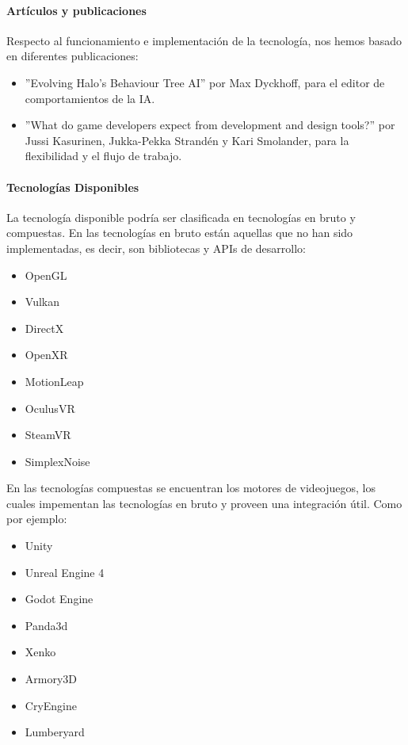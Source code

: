 \documentclass[]{article}
\begin{document}
\paragraph{Art\'iculos y publicaciones}
Respecto al funcionamiento e implementaci\'on de la tecnolog\'ia, nos hemos basado en diferentes publicaciones: 
\begin{itemize}
	\item ''Evolving Halo's Behaviour Tree AI'' por Max Dyckhoff, para el editor de comportamientos de la IA. \cite{Bungie}
	\item ''What do game developers expect from development and design tools?'' por Jussi Kasurinen, Jukka-Pekka Strand\'en y Kari Smolander, para la flexibilidad y el flujo de trabajo. \cite{ACM}
\end{itemize}
\paragraph{Tecnolog\'ias Disponibles}
La tecnolog\'ia disponible podr\'ia ser clasificada en tecnolog\'ias en bruto y compuestas. En las tecnolog\'ias en bruto est\'an aquellas que no han sido implementadas, es decir, son bibliotecas y APIs de desarrollo: 
\begin{itemize}
	\item OpenGL
	\item Vulkan
	\item DirectX
	\item OpenXR
	\item MotionLeap
	\item OculusVR
	\item SteamVR
	\item SimplexNoise
\end{itemize}
En las tecnolog\'ias compuestas se encuentran los motores de videojuegos, los cuales impementan las tecnolog\'ias en bruto y proveen una integraci\'on \'util.
Como por ejemplo: 
\begin{itemize}
	\item Unity
	\item Unreal Engine 4
	\item Godot Engine
	\item Panda3d
	\item Xenko
	\item Armory3D
	\item CryEngine
	\item Lumberyard
\end{itemize}
\end{document}
